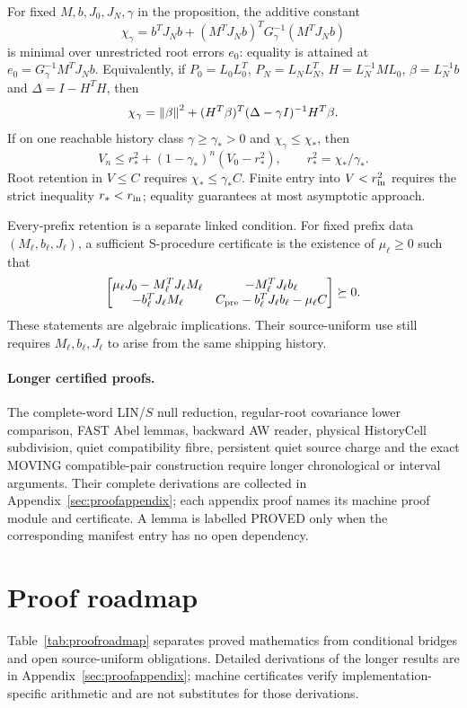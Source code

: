 \documentclass[journal]{IEEEtran}
\begin{document}
\begin{corollary}
For fixed $M,b,J_0,J_N,\gamma$ in the proposition, the additive constant
\[
 \chi_\gamma=b^TJ_Nb+
 (M^TJ_Nb)^TG_\gamma^{-1}(M^TJ_Nb)
\]
is minimal over unrestricted root errors $e_0$: equality is attained at
$e_0=G_\gamma^{-1}M^TJ_Nb$.  Equivalently, if
$P_0=L_0L_0^T$, $P_N=L_NL_N^T$,
$H=L_N^{-1}ML_0$, $\beta=L_N^{-1}b$ and
$\Delta=I-H^TH$, then
\[
 \chi_\gamma=\left\lVert\beta\right\rVert^2+
 (H^T\beta)^T(\Delta-\gamma I)^{-1}H^T\beta .
\]
If on one reachable history class $\gamma\ge\gamma_*>0$ and
$\chi_\gamma\le\chi_*$, then
\[
 V_n\le r_*^2+(1-\gamma_*)^n(V_0-r_*^2),
 \qquad r_*^2=\chi_*/\gamma_* .
\]
Root retention in $V\le C$ requires $\chi_*\le\gamma_*C$.
Finite entry into $V<r_{\rm in}^2$ requires the strict inequality
$r_*<r_{\rm in}$; equality guarantees at most asymptotic approach.

Every-prefix retention is a separate linked condition.  For fixed prefix data
$(M_\ell,b_\ell,J_\ell)$, a sufficient S-procedure certificate is the
existence of $\mu_\ell\ge0$ such that
\[
\begin{bmatrix}
 \mu_\ell J_0-M_\ell^TJ_\ell M_\ell&
 -M_\ell^TJ_\ell b_\ell\\
 -b_\ell^TJ_\ell M_\ell&
 C_{\rm pre}-b_\ell^TJ_\ell b_\ell-\mu_\ell C
\end{bmatrix}\succeq0 .
\]
These statements are algebraic implications.  Their source-uniform use still
requires $M_\ell,b_\ell,J_\ell$ to arise from the same shipping history.
\end{corollary}

\paragraph{Longer certified proofs.}
The complete-word LIN/$S$ null reduction, regular-root covariance lower
comparison, FAST Abel lemmas, backward AW reader, physical HistoryCell
subdivision, quiet compatibility fibre, persistent quiet source charge and
the exact MOVING compatible-pair construction require longer chronological
or interval arguments.  Their complete derivations are collected in
Appendix~\ref{sec:proofappendix}; each appendix proof names its machine proof
module and certificate.  A lemma is labelled PROVED only when the corresponding
manifest entry has no open dependency.

\section{Proof roadmap}
Table~\ref{tab:proofroadmap} separates proved mathematics from conditional
bridges and open source-uniform obligations.  Detailed derivations of the
longer results are in Appendix~\ref{sec:proofappendix}; machine certificates
verify implementation-specific arithmetic and are not substitutes for those
derivations.
\end{document}
